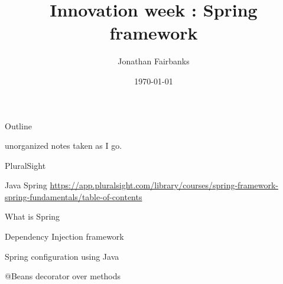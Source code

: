 \documentclass[presentation]{beamer}
\author{Jonathan Fairbanks}
\date{\today}
\title{Innovation week : Spring framework}
\begin{document}
\maketitle
\begin{frame}{Outline}
\tableofcontents
\end{frame}

unorganized notes taken as I go.

\begin{frame}[label={sec:org34d6546}]{PluralSight}
\begin{block}{Java Spring}
\url{https://app.pluralsight.com/library/courses/spring-framework-spring-fundamentals/table-of-contents}
\begin{block}{What is Spring}
\begin{block}{Dependency Injection framework}
\end{block}
\end{block}
\begin{block}{Spring configuration using Java}
\begin{block}{@Beans}
decorator over methods


\end{block}
\end{block}
\end{block}
\end{frame}
\end{document}
